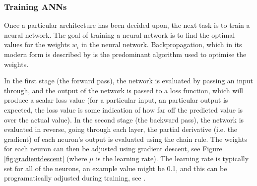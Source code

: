 
          

          \subsubsection{Training ANNs}
          Once a particular architecture has been decided upon, the next task is to train a neural network. The goal of training a neural network is to find the optimal values for the weights $w_i$ in the neural network. Backpropagation, which in its modern form is described by \cite{rumelhart1988learning} is the predominant algorithm used to optimise the weights.

          In the first stage (the forward pass), the network is evaluated by passing an input through, and the output of the network is passed to a loss function, which will produce a scalar loss value (for a particular input, an particular output is expected, the loss value is some indication of how far off the predicted value is over the actual value). In the second stage (the backward pass), the network is evaluated in reverse, going through each layer, the partial derivative (i.e. the gradient) of each neuron's output is evaluated using the chain rule. The weights for each neuron can then be adjusted using gradient descent, see Figure \ref{fig:gradientdescent} (where $\mu$ is the learning rate). The learning rate is typically set for all of the neurons, an example value might be 0.1, and this can be programatically adjusted during training, see \cite{learningratetypes}.

